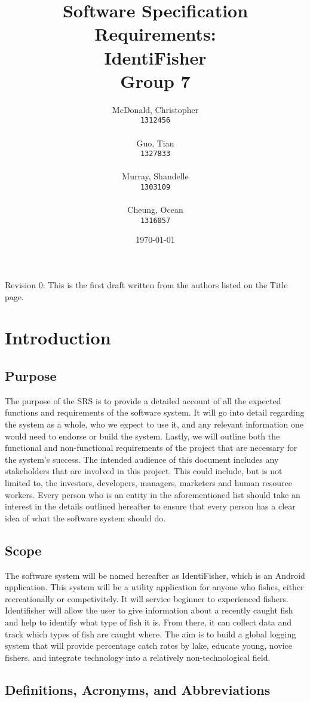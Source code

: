 \documentclass{article}
\title{Software Specification Requirements: \\ IdentiFisher \\ Group 7 \\}
\author{
\Large McDonald, Christopher\\
\texttt{1312456} \\ \\
\Large Guo, Tian\\
\texttt{1327833} \\ \\
\Large Murray, Shandelle\\
\texttt{1303109} \\ \\
\Large Cheung, Ocean\\
\texttt{1316057} \\
}
\date{\today}
\begin{document}
\maketitle

\newpage
\tableofcontents
Revision 0: This is the first draft written from the authors listed on the Title page.
\newpage
\section{Introduction}

\subsection{Purpose}
The purpose of the SRS is to provide a detailed account of all the expected functions
and requirements of the software system. It will go into detail regarding the system
as a whole, who we expect to use it, and any relevant information one would need
to endorse or build the system. Lastly, we will outline both the functional and
non-functional requirements of the project that are necessary for the system's
success. The intended audience of this document includes any stakeholders that are involved in this
project. This could include, but is not limited to, the investors, developers, managers,
marketers and human resource workers. Every person who is an entity in the aforementioned
list should take an interest in the details outlined hereafter to ensure that every person
has a clear idea of what the software system should do.

\subsection{Scope}
The software system will be named hereafter as IdentiFisher, which is an Android application.
This system will be a utility application for anyone who fishes, either recreationally or
competivitely. It will service beginner to experienced fishers. Identifisher will allow
the user to give information about a recently caught fish and help to identify what type
of fish it is. From there, it can collect data and track which types of fish are caught where. The aim is to
build a global logging system that will provide percentage catch rates by lake,
educate young, novice fishers, and integrate technology into a relatively non-technological field.


\subsection{Definitions, Acronyms, and Abbreviations}
\end{document}
